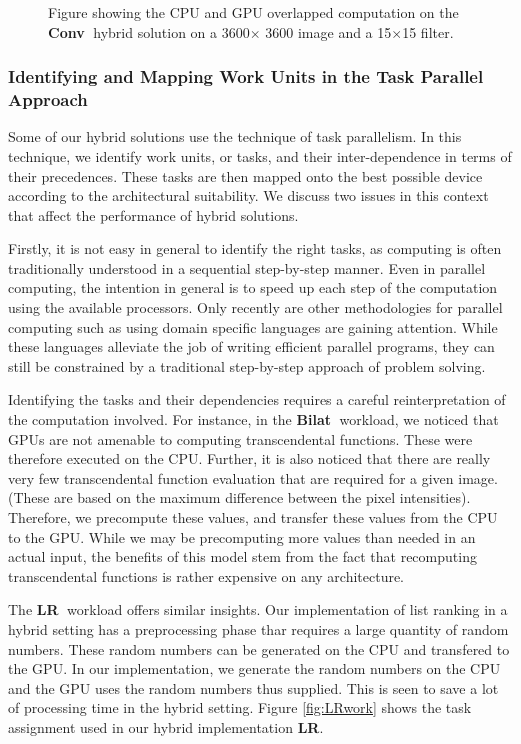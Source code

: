 \documentclass[11pt]{article}
\newcommand{\bilat} {{\bf Bilat}}
\newcommand{\conv} {{\bf Conv}}
\newcommand{\LR} {{\bf LR}}
\begin{document}
\begin{figure}
\centering
{}
\caption{Figure showing the CPU and GPU overlapped computation on the \conv$\;$ hybrid
solution on a 3600$\times$ 3600 image and a 15$\times$15 filter.}
\label{fig:conv}
\end{figure}


\subsubsection{Identifying and Mapping Work Units in the Task Parallel
Approach}
Some of our hybrid solutions use the technique of task parallelism. In this
technique, we identify work units, or tasks, and their inter-dependence in terms
of their precedences. These tasks are then mapped onto the best possible
device according to the architectural suitability. We discuss two issues
in this context that affect the performance of hybrid solutions.

Firstly, it is not easy in general to identify the right tasks, as computing is
often traditionally understood in a sequential step-by-step manner. Even in
parallel computing, the intention in general is to speed up each step of the
computation using the available processors. Only recently are other
methodologies for parallel computing such as using domain specific languages
\cite{dsl1,dsl2} are gaining attention. While these languages
alleviate the job of writing efficient parallel programs, they can still be
constrained by a traditional step-by-step approach of problem solving.


Identifying the tasks and their dependencies requires a careful
reinterpretation of the computation involved. For instance, in the \bilat$\;$
workload, we noticed that GPUs are not amenable to computing transcendental
functions. These were therefore executed on the CPU. Further, it is also
noticed that there are really very few transcendental function evaluation
that are required for a given image. (These are based on the maximum
difference between the pixel intensities). Therefore, we precompute these
values, and transfer these values from the CPU to the GPU. While we may be
precomputing more values than needed in an actual input, the benefits of
this model stem from the fact that recomputing transcendental functions is
rather expensive on any architecture. 

The \LR$\;$ workload offers similar insights. Our implementation of
list ranking in a hybrid setting \cite{hipc11} has a preprocessing phase
thar requires a large quantity of random numbers.  These random numbers can be
generated on the CPU and transfered to the GPU. In our implementation, we
generate the random numbers on the CPU and the GPU uses the 
random numbers thus supplied. This is seen to save a lot of processing time
in the hybrid setting. Figure \ref{fig:LRwork} shows the
task assignment used in our hybrid implementation \LR.
\end{document}
